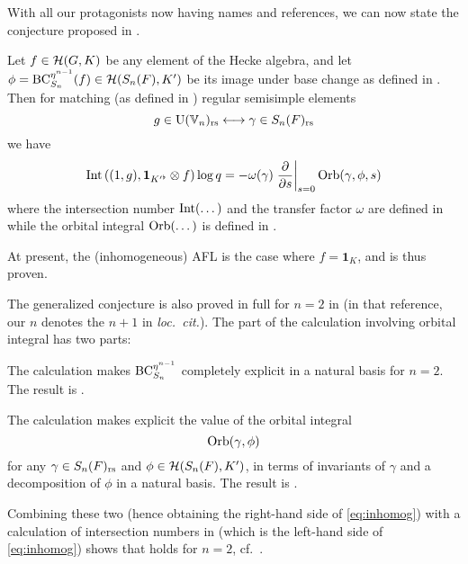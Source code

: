 With all our protagonists now having names and references,
we can now state the conjecture proposed in \cite{ref:AFLspherical}.
\begin{conjecture}
  \label{conj:inhomog}
  Let $f \in \mathcal H(G, K)$ be any element of the Hecke algebra,
  and let $\phi = \operatorname{BC}_{S_n}^{\eta^{n-1}}(f) \in \mathcal H(S_n(F), K')$ be its image
  under base change as defined in .
  Then for matching (as defined in ) regular semisimple elements
  \[ g \in \operatorname{U}(\mathbb V_n)_{\mathrm{rs}} \longleftrightarrow \gamma \in S_n(F)_{\mathrm{rs}} \]
  we have
  \begin{equation}
    \operatorname{Int}\left( (1,g), \mathbf{1}_{K'^\flat} \otimes f \right) \log q
    = -\omega(\gamma) \left. \pdv{}{s} \right\rvert_{s=0} \operatorname{Orb}(\gamma, \phi, s)
    \label{eq:inhomog}
  \end{equation}
  where the intersection number $\operatorname{Int}(\dots)$ and
  the transfer factor $\omega$ are defined in 
  while the orbital integral $\operatorname{Orb}(\dots)$ is defined in .
\end{conjecture}

At present, the (inhomogeneous) AFL is the case where $f = \mathbf{1}_K$,
and is thus proven.

The generalized conjecture is also proved in full for
$n = 2$ in \cite[Theorem 1.0.1]{ref:AFLspherical}
(in that reference, our $n$ denotes the $n+1$ in \emph{loc.\ cit.}).
The part of the calculation involving orbital integral has two parts:
\begin{itemize}
  \ii The calculation makes $\operatorname{BC}_{S_{n}}^{\eta^{n-1}}$
  completely explicit in a natural basis for $n = 2$.
  The result is \cite[Lemma 7.1.1]{ref:AFLspherical}.

  \ii The calculation makes explicit the value of the orbital integral
  \[ \operatorname{Orb}(\gamma, \phi) \]
  for any $\gamma \in S_n(F)_{\mathrm{rs}}$ and $\phi \in \mathcal H(S_n(F), K')$,
  in terms of invariants of $\gamma$ and a decomposition of $\phi$ in a natural basis.
  The result is \cite[Proposition 7.3.2]{ref:AFLspherical}.
\end{itemize}
Combining these two (hence obtaining the right-hand side of \eqref{eq:inhomog})
with a calculation of intersection numbers in \cite[Corollary 7.4.3]{ref:AFLspherical}
(which is the left-hand side of \eqref{eq:inhomog})
shows that  holds for $n = 2$,
cf.\ \cite[Theorem 7.5.1]{ref:AFLspherical}.

